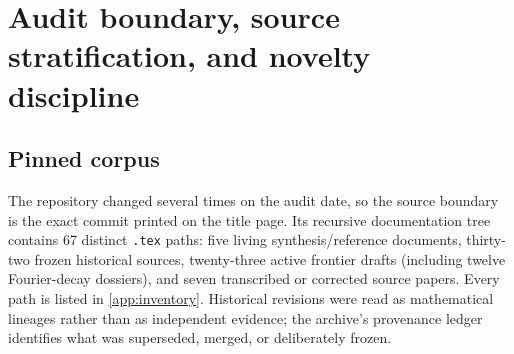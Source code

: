 \documentclass[11pt,oneside]{article}
\numberwithin{equation}{section}
\theoremstyle{definition}
\theoremstyle{remark}
\begin{document}
\begin{abstract}
Finally, a Mellin-reflection identity relates the endpoint Laplace transform directly to
the reflected spectral zeta.  For polynomial weights it explains the complete hierarchy
of logarithmic powers and periodic coefficients, gives a generalized lower-Lambert saddle,
and yields the leading inverse-endpoint law.  Reasonable conjectures and a detailed research
and Lean-formalization program conclude the report.  Numerical experiments were independently
implemented at high precision; the commented Python source and generated data accompany the
paper.
\end{abstract}

\tableofcontents
\clearpage

\section{Audit boundary, source stratification, and novelty discipline}
\label{sec:audit}

\subsection{Pinned corpus}

The repository changed several times on the audit date, so the source boundary is the exact
commit printed on the title page.  Its recursive documentation tree contains 67 distinct
\texttt{.tex} paths: five living synthesis/reference documents, thirty-two frozen historical
sources, twenty-three active frontier drafts (including twelve Fourier-decay dossiers), and
seven transcribed or corrected source papers.  Every path is listed in
\cref{app:inventory}.  Historical revisions were read as mathematical lineages rather than
as independent evidence; the archive's provenance ledger identifies what was superseded,
merged, or deliberately frozen.
\end{document}
